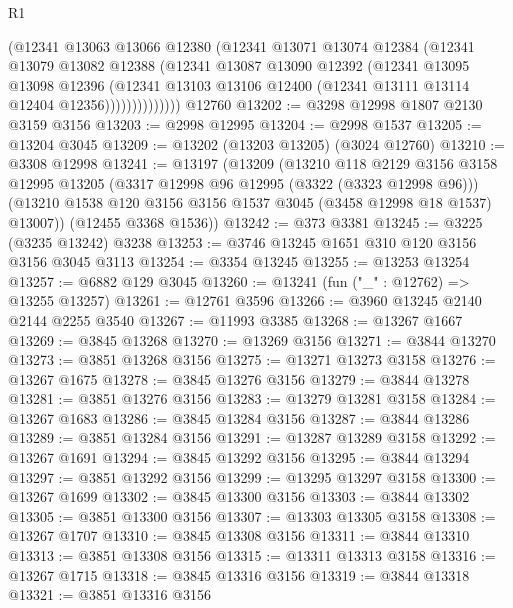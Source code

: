 \begin{lexlean}{R1}
\begin{coremodule}
                  (@12341
                    @13063
                    @13066
                    @12380
                    (@12341
                      @13071
                      @13074
                      @12384
                      (@12341
                        @13079
                        @13082
                        @12388
                        (@12341
                          @13087
                          @13090
                          @12392
                          (@12341
                            @13095
                            @13098
                            @12396
                            (@12341
                              @13103
                              @13106
                              @12400
                              (@12341 @13111 @13114 @12404 @12356))))))))))))))
    @12760
@13202 := @3298 @12998 @1807 @2130 @3159 @3156
@13203 := @2998 @12995
@13204 := @2998 @1537
@13205 := @13204 @3045
@13209 := @13202 (@13203 @13205) (@3024 @12760)
@13210 := @3308 @12998
@13241 := @13197
    (@13209
      (@13210
        @118
        @2129
        @3156
        @3158
        @12995
        @13205
        (@3317 @12998 @96 @12995 (@3322 (@3323 @12998 @96)))
        (@13210 @1538 @120 @3156 @3156 @1537 @3045 (@3458 @12998 @18 @1537) @13007))
      (@12455 @3368 @1536))
@13242 := @373 @3381
@13245 := @3225 (@3235 @13242) @3238
@13253 := @3746 @13245 @1651 @310 @120 @3156 @3156 @3045 @3113
@13254 := @3354 @13245
@13255 := @13253 @13254
@13257 := @6882 @129 @3045
@13260 := @13241 (fun ("_" : @12762) => @13255 @13257)
@13261 := @12761 @3596
@13266 := @3960 @13245 @2140 @2144 @2255 @3540
@13267 := @11993 @3385
@13268 := @13267 @1667
@13269 := @3845 @13268
@13270 := @13269 @3156
@13271 := @3844 @13270
@13273 := @3851 @13268 @3156
@13275 := @13271 @13273 @3158
@13276 := @13267 @1675
@13278 := @3845 @13276 @3156
@13279 := @3844 @13278
@13281 := @3851 @13276 @3156
@13283 := @13279 @13281 @3158
@13284 := @13267 @1683
@13286 := @3845 @13284 @3156
@13287 := @3844 @13286
@13289 := @3851 @13284 @3156
@13291 := @13287 @13289 @3158
@13292 := @13267 @1691
@13294 := @3845 @13292 @3156
@13295 := @3844 @13294
@13297 := @3851 @13292 @3156
@13299 := @13295 @13297 @3158
@13300 := @13267 @1699
@13302 := @3845 @13300 @3156
@13303 := @3844 @13302
@13305 := @3851 @13300 @3156
@13307 := @13303 @13305 @3158
@13308 := @13267 @1707
@13310 := @3845 @13308 @3156
@13311 := @3844 @13310
@13313 := @3851 @13308 @3156
@13315 := @13311 @13313 @3158
@13316 := @13267 @1715
@13318 := @3845 @13316 @3156
@13319 := @3844 @13318
@13321 := @3851 @13316 @3156

\end{coremodule}
\end{lexlean}

